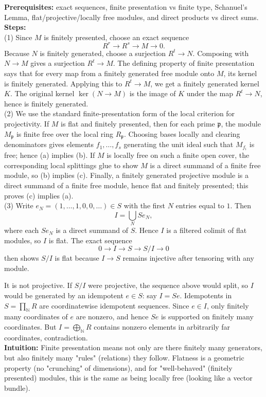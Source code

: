 \begin{solution}
\textbf{Prerequisites:} exact sequences, finite presentation vs finite type, Schanuel's Lemma, flat/projective/locally free modules, and direct products vs direct sums. \\[2ex]

\textbf{Steps:} \\[2ex]
(1) Since $M$ is finitely presented, choose an exact sequence
\[
R^r\longrightarrow R^s\longrightarrow M\longrightarrow 0.
\]
Because $N$ is finitely generated, choose a surjection $R^t\to N$. Composing with $N\to M$ gives a surjection $R^t\to M$. The defining property of finite presentation says that for every map from a finitely generated free module onto $M$, its kernel is finitely generated. Applying this to $R^t\to M$, we get a finitely generated kernel $K$. The original kernel $\ker(N\to M)$ is the image of $K$ under the map $R^t\to N$, hence is finitely generated. \\[2ex]

(2) We use the standard finite-presentation form of the local criterion for projectivity. If $M$ is flat and finitely presented, then for each prime $\mathfrak p$, the module $M_{\mathfrak p}$ is finite free over the local ring $R_{\mathfrak p}$. Choosing bases locally and clearing denominators gives elements $f_1,\ldots,f_s$ generating the unit ideal such that $M_{f_i}$ is free; hence (a) implies (b). If $M$ is locally free on such a finite open cover, the corresponding local splittings glue to show $M$ is a direct summand of a finite free module, so (b) implies (c). Finally, a finitely generated projective module is a direct summand of a finite free module, hence flat and finitely presented; this proves (c) implies (a). \\[2ex]

(3) Write $e_N=(1,\ldots,1,0,0,\ldots)\in S$ with the first $N$ entries equal to $1$. Then
\[
I=\bigcup_N Se_N,
\]
where each $Se_N$ is a direct summand of $S$. Hence $I$ is a filtered colimit of flat modules, so $I$ is flat. The exact sequence
\[
0\longrightarrow I\longrightarrow S\longrightarrow S/I\longrightarrow 0
\]
then shows $S/I$ is flat because $I\to S$ remains injective after tensoring with any module.

It is not projective. If $S/I$ were projective, the sequence above would split, so $I$ would be generated by an idempotent $e\in S$: say $I=Se$. Idempotents in $S=\prod_{\mathbb N}R$ are coordinatewise idempotent sequences. Since $e\in I$, only finitely many coordinates of $e$ are nonzero, and hence $Se$ is supported on finitely many coordinates. But $I=\bigoplus_{\mathbb N}R$ contains nonzero elements in arbitrarily far coordinates, contradiction. \\[2ex]

\textbf{Intuition:} Finite presentation means not only are there finitely many generators, but also finitely many "rules" (relations) they follow. Flatness is a geometric property (no "crunching" of dimensions), and for "well-behaved" (finitely presented) modules, this is the same as being locally free (looking like a vector bundle).
\end{solution}

